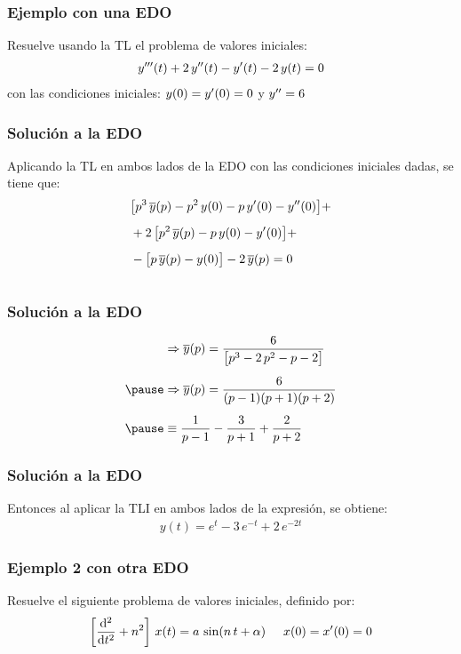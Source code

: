 \begin{frame}
\frametitle{Ejemplo con una EDO}
Resuelve usando la TL el problema de valores iniciales:
\pause
\begin{align*}
{y}^{\prime \prime \prime} (t) +  2 \, {y}^{\prime \prime} (t) - {y}^{\prime}(t) - 2 \, y(t) = 0
\end{align*}
con las condiciones iniciales: $y(0) = {y}^{\prime}(0) = 0$ y ${y}^{\prime \prime} = 6$
\end{frame}
\begin{frame}
\frametitle{Solución a la EDO}
Aplicando la TL en ambos lados de la EDO con las condiciones iniciales dadas, se tiene que:
\pause
\begin{align*}
&\big[ p^{3} \, \overline{y}(p) - p^{2} \, y(0) - p \, {y}^{\prime}(0) - {y}^{\prime \prime}(0)  \big] + \\[0.5em]
&+ 2 \, \big[ p^{2} \, \overline{y}(p) - p \, y(0) - {y}^{\prime}(0)  \big] + \\[0.5em]
&- \big[ p \, \overline{y}(p) - y(0)  \big] - 2 \, \overline{y}(p) = 0 \\[1em]
\end{align*}
\end{frame}
\begin{frame}
\frametitle{Solución a la EDO}    
\begin{eqnarray*}
\begin{aligned}
&\Rightarrow \overline{y}(p) = \dfrac{6}{\big[ p^{3} - 2 \, p^{2} - p -2  \big]} \\[0.5em] \pause
&\Rightarrow \overline{y}(p) = \dfrac{6}{(p - 1)(p + 1)(p +2)} \\[0.5em] \pause
&\equiv \dfrac{1}{p - 1} - \dfrac{3}{p + 1} + \dfrac{2}{p + 2}  
\end{aligned}
\end{eqnarray*}
\end{frame}
\begin{frame}
\frametitle{Solución a la EDO}
Entonces al aplicar la TLI en ambos lados de la expresión, se obtiene:
\pause
\begin{align*}
y (t) = e^{t} - 3 \, e^{-t} + 2 \, e^{- 2 t}
\end{align*}
\end{frame}
\begin{frame}
\frametitle{Ejemplo 2 con otra EDO}
Resuelve el siguiente problema de valores iniciales, definido por:
\pause
\begin{align*}
\left[ \dv[2]{t} + n^{2}\right] \, x (t) = a \, \sin (n \, t +  \alpha) \hspace{0.5cm} x(0) = {x}^{\prime}(0) = 0
\end{align*}
\end{frame}
